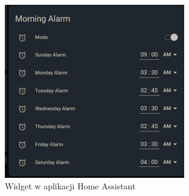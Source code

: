 \documentclass[../main.tex]{subfiles}
\begin{document}
\begin{figure}[H]
    \centering
    \includegraphics[width=0.7\textwidth]{UI.jpeg}
    \caption{Widget w aplikacji Home Assistant}
    \label{fig:widget}
\end{figure}
\end{document}
